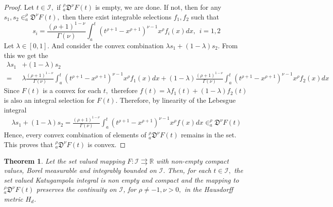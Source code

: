 \documentclass{amsproc}
\newtheorem{theorem}{Theorem}[section]
\theoremstyle{definition}
\theoremstyle{remark}
\numberwithin{equation}{section}
\begin{document}
 \begin{proof}
 Let $t \in \mathcal{I},$ if $_a^\rho\mathfrak{D}^\nu F(t)$ is empty, we are done. If not, then for any $ s_1, s_2 \in _a^\rho\mathfrak{D}^\nu F(t),$ then there exist integrable selections $f_1,f_2$ such that 
 \[ s_i=\frac{(\rho+1)^{1-\nu}}{\Gamma(\nu)}\int_a^t(t^{\rho+1}-x^{\rho+1})^{\nu-1}x^{\rho}f_i(x)dx,~~i=1,2\]  
 Let $ \lambda \in [0,1].$ And consider the convex combination $\lambda s_1+(1-\lambda)s_2.$ From this we get the
 \begin{equation*}
     \begin{aligned}
  \lambda s_1&+(1-\lambda)s_2\\=&\lambda\frac{(\rho+1)^{1-\nu}}{\Gamma(\nu)}\int_a^t(t^{\rho+1}-x^{\rho+1})^{\nu-1}x^{\rho}f_1(x)dx+(1-\lambda)\frac{(\rho+1)^{1-\nu}}{\Gamma(\nu)}\int_a^t(t^{\rho+1}-x^{\rho+1})^{\nu-1}x^{\rho}f_2(x)dx
  \end{aligned}
 \end{equation*}
 Since $F(t)$ is a convex for each $t,$ therefore $f(t)=\lambda f_1(t)+(1-\lambda)f_2(t)$ is also an integral selection for $F(t).$ Therefore, by linearity of the Lebesgue integral
 \begin{equation*}
     \begin{aligned}
    \lambda s_1+(1-\lambda)s_2=\frac{(\rho+1)^{1-\nu}}{\Gamma(\nu)}\int_a^t(t^{\rho+1}-x^{\rho+1})^{\nu-1}x^{\rho}f(x)dx \in _a^\rho\mathfrak{D}^\nu F(t)
     \end{aligned}
 \end{equation*}
 Hence, every convex combination of elements of $_a^\rho\mathfrak{D}^\nu F(t)$ remains in the set. This proves that $_a^\rho\mathfrak{D}^\nu F(t)$ is convex.
 \end{proof}
 \begin{theorem} \label{compact,continuity}
    Let the set valued mapping $F:\mathcal{I} \rightrightarrows \mathbb{R}$ with non-empty compact values, Borel measurable and integrably bounded on $\mathcal{I}.$ Then, for each $t\in \mathcal{I},$ the set valued Katugampola integral is non empty and compact and the mapping  to $_a^\rho\mathfrak{D}^\nu F(t)$ preserves the continuity on $\mathcal{I}$, for $\rho \neq -1, \nu >0,$ in the Hausdorff metric $H_d$. 
\end{theorem}
\end{document}
